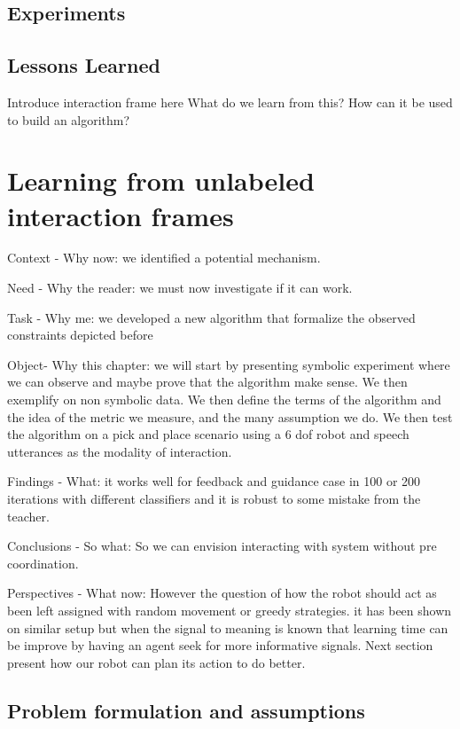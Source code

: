 \section{Experiments}

\section{Lessons Learned} %

Introduce interaction frame here
What do we learn from this? 
How can it be used to build an algorithm?

\chapter{Learning from unlabeled interaction frames}
\minitoc

Context - Why now: we identified a potential mechanism.

Need - Why the reader: we must now investigate if it can work.

Task - Why me: we developed a new algorithm that formalize the observed constraints depicted before

Object- Why this chapter:  we will start by presenting symbolic experiment where we can observe and maybe prove that the algorithm make sense. We then exemplify on non symbolic data. We then define the terms of the algorithm and the idea of the metric we measure, and the many assumption we do. We then test the algorithm on a pick and place scenario using a 6 dof robot and speech utterances as the modality of interaction.

Findings - What: it works well for feedback and guidance case in 100 or 200 iterations with different classifiers and it is robust to some mistake from the teacher.

Conclusions - So what: So we can envision interacting with system without pre coordination. 

Perspectives - What now: However the question of how the robot should act as been left assigned with random movement or greedy strategies. it has been shown on similar setup but when the signal to meaning is known that learning time can be improve by having an agent seek for more informative signals. Next section present how our robot can plan its action to do better.

\section{Problem formulation and assumptions}

